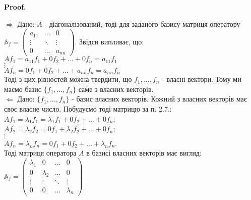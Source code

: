\documentclass[a4paper, 10pt]{article}
\makeatletter
\def\rightproof{$\boxed{\Rightarrow}$ }
\def\leftproof{$\boxed{\Leftarrow}$ }
\theoremstyle{theoremdd}
\renewenvironment{proof}[1][Proof.\\]{\par
\pushQED{\hfill \qed}%
\normalfont \topsep6\p@\@plus6\p@\relax
\trivlist
\item\relax
{\bfseries
#1\@addpunct{.}}\hspace\labelsep\ignorespaces
}{%
\popQED\endtrivlist\@endpefalse
}
\makeatother
\begin{document}
\begin{proof}
\rightproof Дано: $A$ - діагоналізований, тоді для заданого базису матриця оператору $\mathbb{A}_f = \begin{pmatrix}
a_{11} & \dots & 0 \\
\vdots & \ddots & \vdots \\
0 & \dots & a_{nn}
\end{pmatrix}$. Звідси випливає, що:\\
$Af_1 = a_{11}f_1 + 0f_2 + \dots + 0f_n = a_{11}f_1$\\
$\vdots$\\
$Af_n = 0f_1 + 0f_2 + \dots + a_{nn}f_n = a_{nn}f_n$\\
Тоді з цих рівностей можна твердити, що $f_1,\dots,f_n$ - власні вектори. Тому ми маємо базис $\{f_1,\dots,f_n\}$ саме з власних векторів.
\bigskip \\
\leftproof Дано: $\{f_1,\dots,f_n\}$ - базис власних векторів. Кожний з власних векторів має своє власне число. Побудуємо тоді матрицю за п. 2.7.:\\
$Af_1 = \lambda_1 f_1 = \lambda_1 f_1 + 0 f_2 + \dots + 0 f_n$;\\
$Af_2 = \lambda_2 f_2 = 0 f_1 + \lambda_2 f_2 + \dots + 0 f_n$;\\
$\vdots$\\
$Af_n = \lambda_n f_n = 0 f_1 + 0 f_2 + \dots + \lambda_n f_n$.\\
Тоді матриця оператора $A$ в базисі власних векторів має вигляд:\\
$\mathbb{A}_f = \begin{pmatrix}
\lambda_1 & 0 & \dots & 0 \\
0 & \lambda_2 & \dots & 0 \\
\vdots & \vdots & \ddots & \vdots \\
0 & 0 & \dots & \lambda_n
\end{pmatrix}$
\end{proof}
\end{document}
